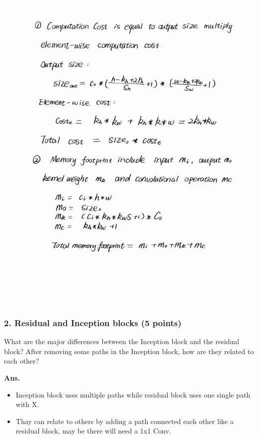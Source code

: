 \documentclass[12pt]{article}%
\begin{document}
\begin{figure}[ht]
	\centering
	\includegraphics[scale=0.5]{1.jpg}
	\label{1}
\end{figure}


\newpage


\subsubsection*{2. Residual and Inception blocks (5 points)}
What are the major differences between the Inception block and the residual block? After removing some paths in the Inception block, how are they related to each other?

\textbf{Ans.} 
\begin{itemize}
	\item Inception block uses multiple paths while residual block uses one single path with X. 
	\item Thay can relate to others by adding a path connected each other like a residual block, may be there will need a 1x1 Conv.
\end{itemize}
\end{document}

